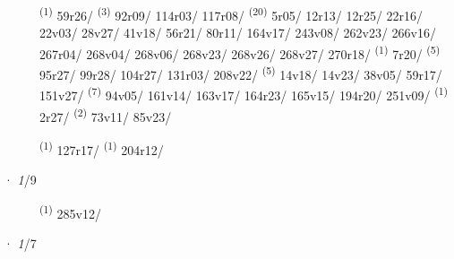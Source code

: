 \begin{description}
    \item[]  \textsuperscript{(1)} \mbox{59r26/} \textsuperscript{(3)} \mbox{92r09/} \mbox{114r03/} \mbox{117r08/} \CASEBREAK {} \textsuperscript{(20)} \mbox{5r05/} \mbox{12r13/} \mbox{12r25/} \mbox{22r16/} \mbox{22v03/} \mbox{28v27/} \mbox{41v18/} \mbox{56r21/} \mbox{80r11/} \mbox{164v17/} \mbox{243v08/} \mbox{262v23/} \mbox{266v16/} \mbox{267r04/} \mbox{268v04/} \mbox{268v06/} \mbox{268v23/} \mbox{268v26/} \mbox{268v27/} \mbox{270r18/} \textsuperscript{(1)} \mbox{7r20/} \textsuperscript{(5)} \mbox{95r27/} \mbox{99r28/} \mbox{104r27/} \mbox{131r03/} \mbox{208v22/} \CASEBREAK {} \textsuperscript{(5)} \mbox{14v18/} \mbox{14v23/} \mbox{38v05/} \mbox{59r17/} \mbox{151v27/} \textsuperscript{(7)} \mbox{94v05/} \mbox{161v14/} \mbox{163v17/} \mbox{164r23/} \mbox{165v15/} \mbox{194r20/} \mbox{251v09/} \CASEBREAK {} \textsuperscript{(1)} \mbox{2r27/} \textsuperscript{(2)} \mbox{73v11/} \mbox{85v23/}
    \item[]  \textsuperscript{(1)} \mbox{127r17/} \CASEBREAK {} \textsuperscript{(1)} \mbox{204r12/}
\end{description}
\ENTRYEND
\noindent{} · \textit{1}/9 \LEMMALINE
\begin{description}
    \item[]  \textsuperscript{(1)} \mbox{285v12/}
\end{description}
\ENTRYEND
\noindent{} · \textit{1}/7 \LEMMALINE
